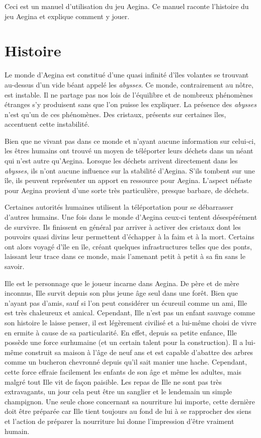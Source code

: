 \documentclass[12pt,a4paper]{article}
\begin{document}
Ceci est un manuel d'utilisation du jeu Aegina. Ce manuel raconte l'histoire du jeu Aegina et explique comment y jouer.

\section{Histoire}

Le monde d'Aegina est constitué d'une quasi infinité d'îles volantes se trouvant au-dessus d'un vide béant appelé les \textit{abysses}. Ce monde, contrairement au nôtre, est instable. Il ne partage pas nos lois de l'équilibre et de nombreux phénomènes étranges s'y produisent sans que l'on puisse les expliquer. La présence des \textit{abysses} n'est qu'un de ces phénomènes. Des cristaux, présents sur certaines îles, accentuent cette instabilité.

 Bien que ne vivant pas dans ce monde et n'ayant aucune information sur celui-ci, les êtres humains ont trouvé un moyen de \og téléporter \fg{} leurs déchets dans un néant qui n'est autre qu'Aegina. Lorsque les déchets arrivent directement dans les  \textit{abysses}, ils n'ont aucune influence sur la stabilité d'Aegina.  S'ils tombent sur une île, ils peuvent représenter un apport en ressource pour Aegina. L'aspect néfaste pour Aegina provient d'une sorte très particulière, presque barbare, de déchets.
 
 Certaines autorités humaines utilisent la \og téléportation \fg{} pour se débarrasser d'autres humains. Une fois dans le monde d'Aegina ceux-ci tentent désespérément de survivre. Ils finissent en général par arriver à activer des cristaux dont les pouvoirs quasi divins leur permettent d'échapper à la faim et à la mort. Certains ont alors voyagé d'île en île, créant quelques infrastructures telles que des ponts, laissant leur trace dans ce monde, mais l'amenant petit à petit à sa fin sans le savoir.
 
 Ille est le personnage que le joueur incarne dans Aegina. De père et de mère inconnus, Ille survit depuis son plus jeune âge seul dans une forêt. Bien que n'ayant pas d'amis, sauf si l'on peut considérer un écureuil comme un ami, Ille est très chaleureux et amical. Cependant, Ille n'est pas un enfant sauvage comme son histoire le laisse penser, il est légèrement civilisé et a lui-même choisi de vivre en ermite à cause de sa particularité. En effet, depuis sa petite enfance, Ille possède une force surhumaine (et un certain talent pour la construction). Il a lui-même construit sa maison à l'âge de neuf ans et est capable d'abattre des arbres comme un bucheron chevronné depuis qu'il sait manier une hache. Cependant, cette force effraie facilement les enfants de son âge et même les adultes, mais malgré tout Ille vit de façon paisible. Les repas de Ille ne sont pas très extravagants,  un jour cela peut être un sanglier et le lendemain un simple champignon. Une seule chose concernant sa nourriture lui importe, cette dernière doit être préparée car Ille tient toujours au fond de lui à se rapprocher des siens et l'action de préparer la nourriture lui donne l'impression d'être vraiment humain.
      
\end{document}
